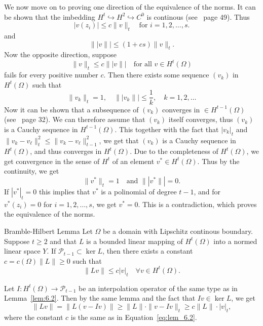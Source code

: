 \begin{bev}
We now move on to proving one direction of the equivalence of the norms. 
It can be shown that the imbedding $H^t\hookrightarrow H^2 \hookrightarrow C^0$ is continous (see~\cite{Braess} page 49). Thus
\begin{equation*}
    |v(z_i)|\leq c\|v\|_t\quad \text{for } i=1,2,\ldots,s.
\end{equation*} 
and
\begin{equation*}
    \||v\||\leq (1+cs)\|v\|_t.
\end{equation*}
Now the opposite direction, suppose 
\begin{equation*}
    \|v\|_t\leq c\||v\||\quad \text{for all } v\in H^t(\Omega)
\end{equation*}
fails for every positive number $c$. Then there exists some sequence $(v_k)$ in $H^t(\Omega)$ such that
\begin{equation*}
    \|v_k\|_t=1,\quad \||v_k\||\leq \frac{1}{k},\quad k=1,2,\ldots
\end{equation*}
Now it can be shown that a subsequence of $(v_k)$ converges in $\in H^{t-1}(\Omega)$ (see~\cite{Braess} page 32). We can therefore assume that $(v_k)$ itself converges, thus $(v_k)$ is a Cauchy sequence in $H^{t-1}(\Omega)$.
This together with the fact that $|v_k|_t$ and $\|v_k-v_\ell\|_t^2\leq\|v_k-v_\ell\|_{t-1}^2$, we get that $(v_k)$ is a Cauchy sequence in $H^t(\Omega)$, and thus converges in $H^t(\Omega)$.
Due to the completeness of $H^t(\Omega)$, we get convergence in the sense of $H^t$ of an element $v^*\in H^t(\Omega)$. 
Thus by the continuity, we get 
\begin{equation}
    \|v^*\|_t = 1\quad \text{and }\||v^*\||=0. 
\end{equation}
If $|v^*|_t = 0$ this implies that $v^*$ is a polinomial of degree $t-1$, and for $v^*(z_i)=0$ for $i=1,2,\ldots,s$, we get $v^*=0$. This is a contradiction, which proves the equivalence of the norms.
\end{bev}

\begin{lem}{Bramble-Hilbert Lemma}
    Let $\Omega$ be a domain with Lipschitz continous boundary. Suppose $t\geq 2$ and that $L$ is a bounded linear mapping of $H^t(\Omega)$ into a normed linear space $Y$.
    If $\mathcal{P}_{t-1}\subset \ker L$, then there exists a constant $c=c(\Omega)\|L\|\geq 0$ such that
    \begin{equation}
        \|Lv\|\leq c|v|_t\quad \forall v\in H^t(\Omega).
    \end{equation}
\end{lem}
\begin{bev}
    Let $I:H^t(\Omega)\rightarrow \mathcal{P}_{t-1}$ be an interpolation operator of the same type as in Lemma~\ref{lem:6.2}. Then by the same lemma and the fact that $Iv\in\ker L$, we get
    \begin{equation}
        \|Lv\|=\|L(v-Iv)\|\geq \|L\|\cdot\|v-Iv\|_t\geq c\|L\| \cdot |v|_t,
    \end{equation}
    where the constant $c$  is the same as in Equation~\ref{eq:lem_6.2}.~\label{lem:6.3}
\end{bev}